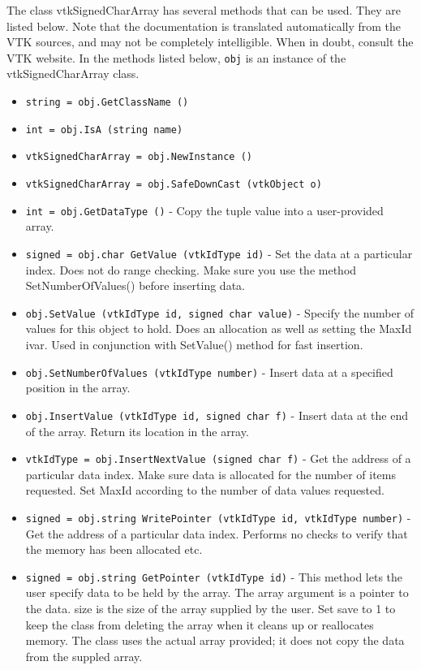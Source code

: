 The class vtkSignedCharArray has several methods that can be used.
  They are listed below.
Note that the documentation is translated automatically from the VTK sources,
and may not be completely intelligible.  When in doubt, consult the VTK website.
In the methods listed below, \verb|obj| is an instance of the vtkSignedCharArray class.
\begin{itemize}
\item  \verb|string = obj.GetClassName ()|

\item  \verb|int = obj.IsA (string name)|

\item  \verb|vtkSignedCharArray = obj.NewInstance ()|

\item  \verb|vtkSignedCharArray = obj.SafeDownCast (vtkObject o)|

\item  \verb|int = obj.GetDataType ()| -  Copy the tuple value into a user-provided array.

\item  \verb|signed = obj.char GetValue (vtkIdType id)| -  Set the data at a particular index. Does not do range checking. Make sure
 you use the method SetNumberOfValues() before inserting data.

\item  \verb|obj.SetValue (vtkIdType id, signed char value)| -  Specify the number of values for this object to hold. Does an
 allocation as well as setting the MaxId ivar. Used in conjunction with
 SetValue() method for fast insertion.

\item  \verb|obj.SetNumberOfValues (vtkIdType number)| -  Insert data at a specified position in the array.

\item  \verb|obj.InsertValue (vtkIdType id, signed char f)| -  Insert data at the end of the array. Return its location in the array.

\item  \verb|vtkIdType = obj.InsertNextValue (signed char f)| -  Get the address of a particular data index. Make sure data is allocated
 for the number of items requested. Set MaxId according to the number of
 data values requested.

\item  \verb|signed = obj.string WritePointer (vtkIdType id, vtkIdType number)| -  Get the address of a particular data index. Performs no checks
 to verify that the memory has been allocated etc.

\item  \verb|signed = obj.string GetPointer (vtkIdType id)| -  This method lets the user specify data to be held by the array.  The
 array argument is a pointer to the data.  size is the size of
 the array supplied by the user.  Set save to 1 to keep the class
 from deleting the array when it cleans up or reallocates memory.
 The class uses the actual array provided; it does not copy the data
 from the suppled array. 

\end{itemize}
